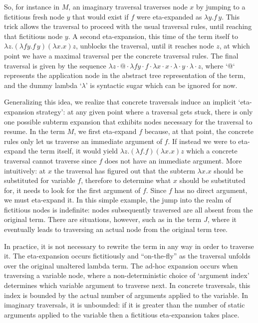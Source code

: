 \documentclass{elsarticle}
\theoremstyle{plain}
\theoremstyle{definition}
\begin{document}
So, for instance in $M$, an imaginary traversal traverses node $x$ by jumping to a fictitious fresh node $y$ that would exist if $f$ were eta-expanded
as $\lambda y.f\, y$. This trick allows the traversal to proceed with the usual traversal rules, until reaching that fictitious node $y$.
A second eta-expansion, this time of the term itself to
$\lambda z. (\lambda f y.f\, y)(\lambda x.x) z$,
unblocks the traversal, until it reaches node $z$, at which point we have a maximal traversal per the concrete traversal rules. The final traversal is given by the sequence $\lambda z \cdot @ \cdot \lambda f y \cdot f \cdot \lambda x \cdot x \cdot \lambda \cdot y \cdot \lambda \cdot z$, where `@` represents the application node in the abstract tree representation of the term, and the dummy lambda `$\lambda$' is syntactic sugar which can be ignored for now.

Generalizing this idea, we realize that concrete traversals induce an implicit `eta-expansion strategy': at any given point where a traversal gets stuck, there is only one possible subterm expansion that exhibits nodes necessary for the traversal to resume. In the term $M$, we first eta-expand $f$ because, at that point, the concrete rules only let us
traverse an immediate argument of $f$. If instead we were to eta-expand the term itself, it would yield $\lambda z. (\lambda f .f)(\lambda x.x) z$
which a concrete traversal cannot traverse since $f$ does not have an immediate argument. More intuitively: at $x$ the traversal has figured out that the subterm $\lambda x.x$ should be substituted for variable $f$, therefore to determine what $x$ should be substituted for, it needs to look for the first argument of $f$. Since $f$ has no direct argument, we must eta-expand it. In this simple example, the jump into the realm of fictitious nodes is indefinite: nodes subsequently traversed are all absent from the original term. There are situations, however, such as in the term $J$, where it eventually leads to traversing an actual node from the original term tree.

In practice, it is not necessary to rewrite the term in any way in order to traverse it.
The eta-expansion occurs fictitiously and ``on-the-fly'' as the traversal unfolds over the original unaltered lambda term.
The ad-hoc expansion occurs when traversing a variable node, where a non-deterministic choice of `argument index' determines which variable argument to traverse next. In concrete traversals, this index is bounded by the actual number of arguments applied to the variable. In imaginary traversals, it is unbounded: if it is greater than the number of static arguments applied to the variable then a fictitious eta-expansion takes place.
\end{document}
